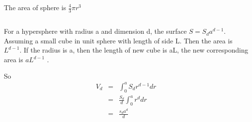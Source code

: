 \documentclass{article} %
\begin{document}
The area of sphere is $\frac{4}{3} \pi r ^ 3$








\subsection{}

For a hypersphere with radius a and dimension d, the surface $S = S_d a ^{d-1}$. Assuming a small cube in unit sphere with length of side L. Then the area is $L^{d-1}$. If the radius is a, then the length of new cube is aL, the new corresponding area is $aL^{d-1}$ .

So 
\begin{equation}
    \begin{array}{rcl}
     	V_d  & = &\int_{0}^{a}  S_d r^{d-1} dr \\
	& = & \frac{S_d}{d} \int_{0}^{a} r^d dr \\
	& = & \frac{s_d a^d}{d}
    \end{array}
\end{equation}
\end{document}
